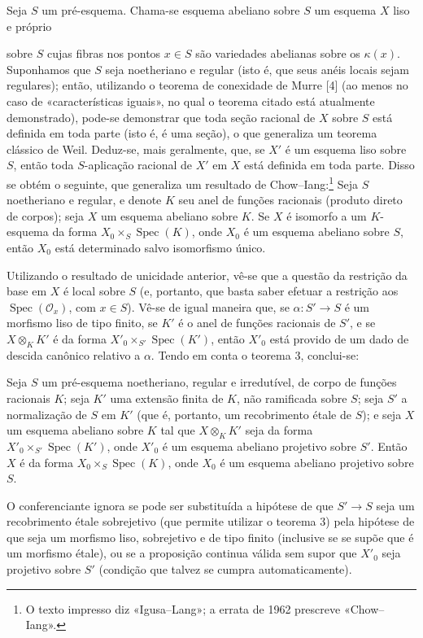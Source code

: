 Seja $S$ um pré-esquema. Chama-se esquema abeliano sobre $S$ um esquema $X$
liso e próprio

sobre $S$ cujas fibras nos pontos $x\in S$ são variedades abelianas sobre os
$\kappa(x)$. Suponhamos que $S$ seja noetheriano e regular
(isto é, que seus anéis locais sejam regulares); então, utilizando o
teorema de conexidade de Murre [4] (ao menos no caso de «características
iguais», no qual o teorema citado está atualmente demonstrado), pode-se
demonstrar que toda seção racional de $X$ sobre $S$ está definida em toda
parte (isto é, é uma seção), o que generaliza um teorema clássico de
Weil. Deduz-se, mais geralmente, que, se $X'$ é um esquema liso sobre $S$,
então toda $S$-aplicação racional de $X'$ em $X$ está definida em toda
parte. Disso se obtém o seguinte, que generaliza um resultado de
Chow--Iang:\footnote{O texto impresso diz «Igusa--Lang»; a errata de 1962
prescreve «Chow--Iang».} Seja $S$ noetheriano e regular, e denote $K$ seu
anel de funções racionais (produto direto de corpos); seja $X$ um
esquema abeliano sobre $K$. Se $X$ é isomorfo a um $K$-esquema da forma
$X_0\times_S\operatorname{Spec}(K)$, onde $X_0$ é um esquema abeliano sobre
$S$, então $X_0$ está determinado salvo isomorfismo único.

Utilizando o resultado de unicidade anterior, vê-se que a questão da
restrição da base em $X$ é local sobre $S$ (e, portanto, que basta saber
efetuar a restrição aos $\operatorname{Spec}(\mathcal O_x)$, com
$x\in S$). Vê-se de igual maneira que, se
$\alpha:S'\longrightarrow S$ é um morfismo liso de tipo finito, se $K'$ é o
anel de funções racionais de $S'$, e se $X\otimes_KK'$ é da forma
$X'_0\times_{S'}\operatorname{Spec}(K')$, então $X'_0$ está provido de um
dado de descida canônico relativo a $\alpha$. Tendo em conta o teorema 3,
conclui-se:

 Seja $S$ um pré-esquema noetheriano, regular e
irredutível, de corpo de funções racionais $K$; seja $K'$ uma extensão
finita de $K$, não ramificada sobre $S$; seja $S'$ a normalização de $S$ em
$K'$ (que é, portanto, um recobrimento étale de $S$); e seja $X$ um esquema
abeliano sobre $K$ tal que $X\otimes_KK'$ seja da forma
$X'_0\times_{S'}\operatorname{Spec}(K')$, onde $X'_0$ é um esquema abeliano
projetivo sobre $S'$. Então $X$ é da forma
$X_0\times_S\operatorname{Spec}(K)$, onde $X_0$ é um esquema abeliano
projetivo sobre $S$.

 O conferenciante ignora se pode ser substituída a
hipótese de que $S'\longrightarrow S$ seja um recobrimento étale sobrejetivo
(que permite utilizar o teorema 3) pela hipótese de que seja um morfismo
liso, sobrejetivo e de tipo finito (inclusive se se supõe que é um morfismo
étale), ou se a proposição continua válida sem supor que $X'_0$ seja
projetivo sobre $S'$ (condição que talvez se cumpra automaticamente).

